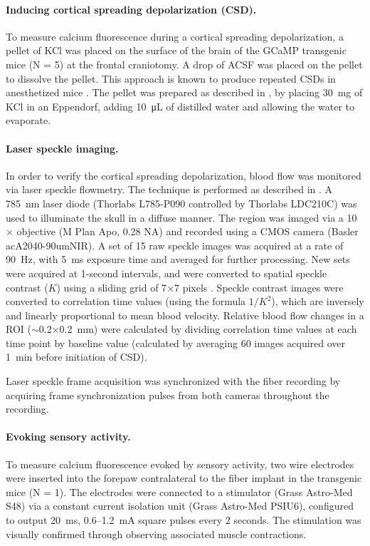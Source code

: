 \paragraph{Inducing cortical spreading depolarization (CSD).} To measure calcium 
fluorescence during a cortical spreading depolarization, a pellet of 
KCl was placed on the surface of the brain of the GCaMP transgenic 
mice (N = 5) at the frontal craniotomy. A drop of ACSF was 
placed on the pellet to dissolve the pellet. This approach is known to
 produce repeated CSDs in anesthetized mice \cite{Karatas:2013ir}. The
 pellet was prepared as described in \cite{Karatas:2013ir}, by placing
 30~mg of KCl in an Eppendorf, adding 10~\si{\micro\liter} of distilled water and 
allowing the water to evaporate.



\paragraph{Laser speckle imaging.} In order to verify the cortical spreading 
depolarization, blood flow was monitored via laser speckle flowmetry. 
The technique is performed as described in 
\cite{Dunn:2001dj,Karatas:2013ir}. A 785~\si{\nano\meter} laser diode 
(Thorlabs L785-P090 controlled by Thorlabs LDC210C) was used to illuminate 
the skull in a diffuse manner. The region was imaged via a 10$\times$ 
objective (M Plan Apo, 0.28 NA) and recorded using a CMOS camera 
(Basler acA2040-90umNIR). A set of 15 raw speckle images was acquired 
at a rate of 90~\si{\hertz}, with 5~ms exposure time and averaged for 
further processing. New sets were acquired at 1-second intervals, and 
were converted to spatial speckle contrast ($K$) using a sliding grid of 
7$\times$7 pixels \cite{Tom:2008hm}. Speckle contrast images were 
converted to correlation time values (using the formula $1/K^2$), which 
are inversely and linearly proportional to mean blood velocity. Relative 
blood flow changes in a ROI ($\sim$0.2$\times$0.2~mm) were calculated 
by dividing correlation time values at each time point by baseline value 
(calculated by averaging 60 images acquired over 1~min before initiation 
of CSD).

Laser speckle frame acquisition was synchronized with the fiber 
recording by acquiring frame synchronization pulses from both cameras 
throughout the recording.



\paragraph{Evoking sensory activity.} To measure calcium fluorescence evoked by 
sensory activity, two wire electrodes were inserted into the forepaw 
contralateral to the fiber implant in the transgenic mice (N = 1). The
 electrodes were connected to a stimulator (Grass Astro-Med S48) via a
 constant current isolation unit (Grass Astro-Med PSIU6), configured 
to output 20~ms, 0.6--1.2~\si{\milli\ampere} square pulses every 2 
seconds. The stimulation was visually confirmed through observing 
associated muscle contractions.




